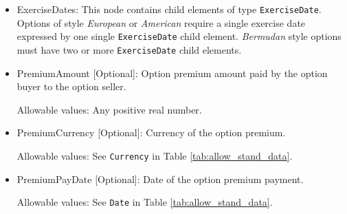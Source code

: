 \begin{itemize}
\item ExerciseDates: This node contains child elements of type
  \lstinline!ExerciseDate!.  Options of style \emph{European} or
  \emph{American} require a single exercise date expressed by one
  single \lstinline!ExerciseDate! child element.  \emph{Bermudan}
  style options must have two or more \lstinline!ExerciseDate! child
  elements.

\item PremiumAmount [Optional]: Option premium amount paid by the option buyer to the option seller.

Allowable values:  Any positive real number.

\item PremiumCurrency [Optional]: Currency of the option premium.

Allowable values:  See \lstinline!Currency! in Table \ref{tab:allow_stand_data}.

\item PremiumPayDate [Optional]: Date of the option premium payment.

Allowable values:  See \lstinline!Date! in Table \ref{tab:allow_stand_data}.

\end{itemize}

